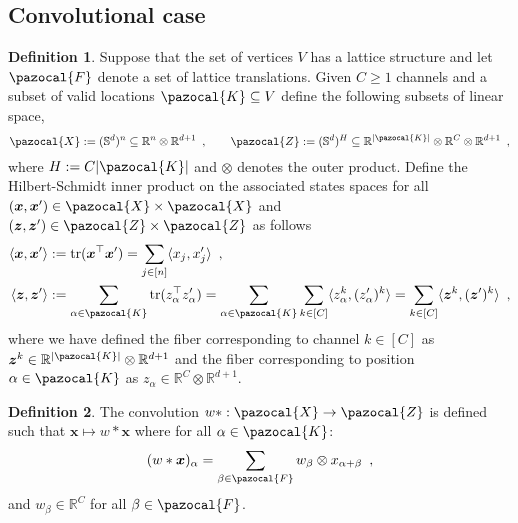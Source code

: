 \documentclass[12pt]{article}
\DeclareMathOperator{\tr}{tr}
\theoremstyle{definition}%
\theoremstyle{definition}
\newtheorem{defn}{Definition}[section]
\theoremstyle{remark}
\begin{document}
\subsection{Convolutional case}
\begin{defn}
Suppose that the set of vertices $V$ has a lattice structure and let $\pazocal{F}$ denote a set of lattice translations. Given $C \geq 1$ channels and a subset of valid locations $\pazocal{K} \subseteq V$ define the following subsets of linear space,
\begin{equation}
	\pazocal{X} := (\mathbb{S}^d)^n \subseteq \mathbb{R}^{n}\otimes \mathbb{R}^{d+1} \enspace , \quad \quad \pazocal{Z} := (\mathbb{S}^d)^H \subseteq \mathbb{R}^{|\pazocal{K}|} \otimes \mathbb{R}^C \otimes \mathbb{R}^{d+1} \enspace ,
\end{equation}
where $H := C | \pazocal{K}|$ and $\otimes$ denotes the outer product. Define the Hilbert-Schmidt inner product on the associated states spaces for all $(\bm{x},\bm{x}') \in \pazocal{X} \times \pazocal{X}$ and $(\bm{z},\bm{z}') \in \pazocal{Z} \times \pazocal{Z}$ as follows
\begin{align}
	\langle \bm{x} , \bm{x}' \rangle
		& := \tr(\bm{x}^\top \bm{x}') = \sum_{j \in [n]} \langle x_j, x'_j \rangle \enspace , \\
	\langle \bm{z} , \bm{z}' \rangle
		& := \sum_{\alpha \in \pazocal{K}} \tr(z_\alpha^\top z_\alpha') = \sum_{\alpha \in \pazocal{K}} \sum_{k \in [C]} \langle z_\alpha^k, (z'_\alpha)^k \rangle = \sum_{k \in [C]} \langle \bm{z}^k, (\bm{z}')^k \rangle \enspace ,
\end{align}
where we have defined the fiber corresponding to channel $k \in [C]$ as $\bm{z}^k \in \mathbb{R}^{|\pazocal{K}|} \otimes \mathbb{R}^{d+1}$ and the fiber corresponding to position $\alpha \in \pazocal{K}$ as $z_\alpha \in \mathbb{R}^C \otimes \mathbb{R}^{d+1}$.
\end{defn}

\begin{defn}
The convolution $w\ast: \pazocal{X} \to \pazocal{Z}$ is defined such that $\bm{x} \mapsto w \ast \bm{x}$ where for all $\alpha \in \pazocal{K}$:
\begin{equation}
	(w \ast \bm{x})_\alpha = \sum_{\beta \in \pazocal{F}} w_\beta \otimes x_{\alpha + \beta} \enspace ,
\end{equation}
and $w_\beta \in \mathbb{R}^C$ for all $\beta \in \pazocal{F}$.
\end{defn}
\end{document}
